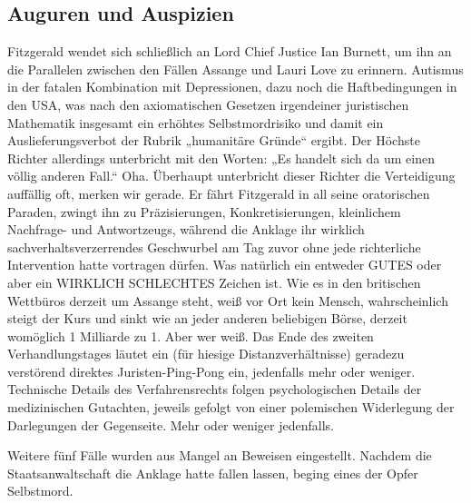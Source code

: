 \begin{multicols}{2}

\chapter{Auguren und Auspizien}
Fitzgerald wendet sich schließlich an Lord Chief Justice
Ian Burnett, um ihn an die Parallelen zwischen den Fällen Assange und Lauri Love zu erinnern. Autismus in der
fatalen Kombination mit Depressionen, dazu noch die
Haftbedingungen in den USA, was nach den axiomatischen Gesetzen irgendeiner juristischen Mathematik
insgesamt ein erhöhtes Selbstmordrisiko und damit ein
Auslieferungsverbot der Rubrik „humanitäre Gründe“
ergibt. Der Höchste Richter allerdings unterbricht mit
den Worten: „Es handelt sich da um einen völlig anderen
Fall.“ Oha. Überhaupt unterbricht dieser Richter die Verteidigung auffällig oft, merken wir gerade. Er fährt Fitzgerald in all seine oratorischen Paraden, zwingt ihn zu
Präzisierungen, Konkretisierungen, kleinlichem Nachfrage- und Antwortzeugs, während die Anklage ihr wirklich sachverhaltsverzerrendes Geschwurbel am Tag zuvor ohne jede richterliche Intervention hatte vortragen
dürfen.
Was natürlich ein entweder GUTES oder aber ein WIRKLICH SCHLECHTES Zeichen ist. Wie es in den britischen
Wettbüros derzeit um Assange steht, weiß vor Ort kein
Mensch, wahrscheinlich steigt der Kurs und sinkt wie
an jeder anderen beliebigen Börse, derzeit womöglich 1
Milliarde zu 1. Aber wer weiß.
Das Ende des zweiten Verhandlungstages läutet ein
(für hiesige Distanzverhältnisse) geradezu verstörend
direktes Juristen-Ping-Pong ein, jedenfalls mehr oder
weniger. Technische Details des Verfahrensrechts folgen
psychologischen Details der medizinischen Gutachten,
jeweils gefolgt von einer polemischen Widerlegung der
Darlegungen der Gegenseite. Mehr oder weniger jedenfalls.

Weitere fünf Fälle wurden aus Mangel an Beweisen eingestellt. Nachdem die Staatsanwaltschaft die Anklage
hatte fallen lassen, beging eines der Opfer Selbstmord.


\end{multicols}
